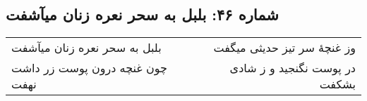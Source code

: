 \begin{center}
\section*{شماره ۴۶: بلبل به سحر نعره زنان میآشفت}
\label{sec:046}
\begin{longtable}{l p{0.5cm} r}
بلبل به سحر نعره زنان میآشفت
&&
وز غنچهٔ سر تیز حدیثی میگفت
\\
چون غنچه درون پوست زر داشت نهفت
&&
در پوست نگنجید و ز شادی بشکفت
\\
\end{longtable}
\end{center}
